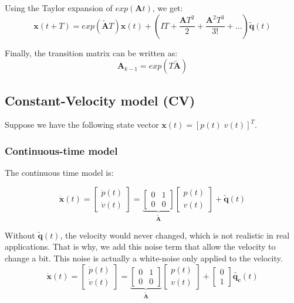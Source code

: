 Using the Taylor expansion of $exp(\mathbf{A}t)$, we get:
\begin{equation}
    \mathbf{x}(t+T) = exp(\mathbf{\tilde{A}}T)\mathbf{x}(t) + \left( IT + \frac{\mathbf{A}T^2}{2} + \frac{\mathbf{A}^2T^3}{3!} + \dots \right) \mathbf{\tilde{q}}(t) \end{equation}

Finally, the transition matrix can be written as: 
\begin{equation}
    \mathbf{A}_{k-1} = exp(T \mathbf{\tilde{A}})
\end{equation}

\subsection{Constant-Velocity model (CV)}
Suppose we have the following state vector $\mathbf{x}(t) = [p(t) \; v(t)]^T$.

\subsubsection{Continuous-time model}
The continuous time model is:

\begin{equation}
    \mathbf{\dot{x}}(t) = 
    \left[ \begin{array}{c}
        \dot{p}(t) \\
        \dot{v}(t)
    \end{array}\right] = \underbrace{\left[\begin{array}{cc}
        0 & 1 \\
        0 & 0
    \end{array}\right]}_{\mathbf{\tilde{A}}} \left[\begin{array}{c}
        p(t) \\
        v(t)
    \end{array}\right] + \mathbf{\tilde{q}}(t)
\end{equation}

Without $\mathbf{\tilde{q}}(t)$, the velocity would never changed, which is not realistic in real applications. That is why, we add this noise term that allow the velocity to change a bit. This noise is actually a white-noise only applied to the velocity.
\begin{equation}
    \mathbf{\dot{x}}(t) = 
    \left[ \begin{array}{c}
        \dot{p}(t) \\
        \dot{v}(t)
    \end{array}\right] = \underbrace{\left[\begin{array}{cc}
        0 & 1 \\
        0 & 0
    \end{array}\right]}_{\mathbf{\tilde{A}}} \left[\begin{array}{c}
        p(t) \\
        v(t)
    \end{array}\right] + \left[\begin{array}{c}
        0 \\
        1
    \end{array}\right]\mathbf{\tilde{q_c}}(t)
\end{equation}


